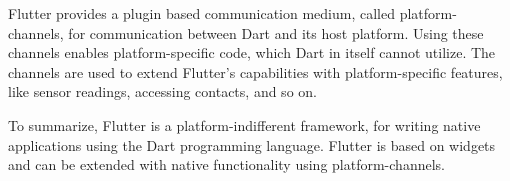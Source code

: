 Flutter provides a plugin based communication medium, called platform-channels, for communication between Dart and its host platform\cite{flutter_plugins}. Using these channels enables platform-specific code, which Dart in itself cannot utilize. The channels are used to extend Flutter's capabilities with platform-specific features, like sensor readings, accessing contacts, and so on.

To summarize, Flutter is a platform-indifferent framework, for writing native applications using the Dart programming language. Flutter is based on widgets and can be extended with native functionality using platform-channels.
